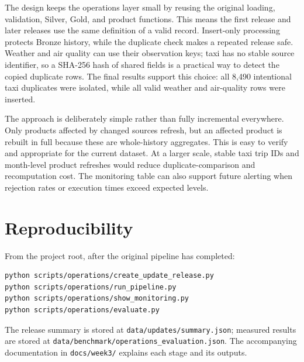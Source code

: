 \documentclass[11pt]{article}
\begin{document}
The design keeps the operations layer small by reusing the original loading,
validation, Silver, Gold, and product functions. This means the first release
and later releases use the same definition of a valid record. Insert-only
processing protects Bronze history, while the duplicate check makes a repeated
release safe. Weather and air quality can use their observation keys; taxi has
no stable source identifier, so a SHA-256 hash of shared fields is a practical
way to detect the copied duplicate rows. The final results support this choice:
all 8,490 intentional taxi duplicates were isolated, while all valid weather
and air-quality rows were inserted.

The approach is deliberately simple rather than fully incremental everywhere.
Only products affected by changed sources refresh, but an affected product is
rebuilt in full because these are whole-history aggregates. This is easy to
verify and appropriate for the current dataset. At a larger scale, stable taxi
trip IDs and month-level product refreshes would reduce duplicate-comparison
and recomputation cost. The monitoring table can also support future alerting
when rejection rates or execution times exceed expected levels.
\section{Reproducibility}

From the project root, after the original pipeline has completed:

\begin{verbatim}
python scripts/operations/create_update_release.py
python scripts/operations/run_pipeline.py
python scripts/operations/show_monitoring.py
python scripts/operations/evaluate.py
\end{verbatim}

The release summary is stored at \texttt{data/updates/summary.json}; measured
results are stored at \texttt{data/benchmark/operations\_evaluation.json}.
The accompanying documentation in \texttt{docs/week3/} explains each stage and
its outputs.
\end{document}
